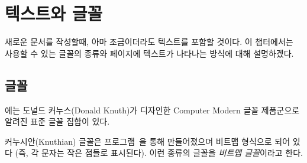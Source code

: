 \chapter{텍스트와 글꼴}



새로운 문서를 작성할때, 아마 조금이더라도 텍스트를 포함할 것이다. 
이 챕터에서는 사용할 수 있는 글꼴의 종류와 페이지에 텍스트가 나타나는 방식에
대해 설명하겠다.



\section{글꼴} \label{sec:fonts}

\alltx{}에는 도널드 커누스(Donald Knuth)가 디자인한
Computer Modern
글꼴 제품군으로 알려진 표준 글꼴 집합이 있다.

커누시안(Knuthian) 글꼴은
\metafont{}
프로그램~\cite{METAFONT,CM}을
통해 만들어졌으며 비트맵 형식으로 되어 있다 (즉, 각
문자는 작은 점들로 표시된다).
이런 종류의 글꼴을
\emph{비트맵 글꼴}이라고 한다.

